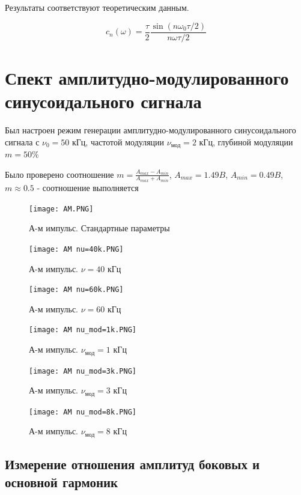 \documentclass[a4paper]{article}
\begin{document}
Результаты соответствуют теоретическим данным.

\begin{equation}
    c_n(\omega) = \frac{\tau}{2} \frac{\sin{(n\omega_0 \tau / 2)}}{n \omega \tau / 2}
\end{equation}

\clearpage
\newpage

\section{Спект амплитудно-модулированного синусоидального сигнала}

Был настроен режим генерации амплитудно-модулированного синусоидального сигнала
с $\nu_0 = 50$ кГц, частотой модуляции $\nu_\text{мод} = 2$ кГц, глубиной модуляции $m = 50\%$

Было проверено соотношение $ m = \frac{A_{max} - A_{min}}{A_{max} + A_{min}} $,
$A_{max} = 1.49B$, $A_{min} = 0.49B$, $m \approx 0.5$ - соотношение выполняется

\begin{figure}[h!]
\centering
\texttt{[image: АМ.PNG]}
\caption{А-м импульс. Стандартные параметры}
\end{figure}

\begin{figure}[h!]
\centering
\texttt{[image: АМ nu=40k.PNG]}
\caption{А-м импульс. $\nu = 40$ кГц}
\end{figure}

\begin{figure}[h!]
\centering
\texttt{[image: АМ nu=60k.PNG]}
\caption{А-м импульс. $\nu = 60$ кГц}
\end{figure}

\begin{figure}[h!]
\centering
\texttt{[image: АМ nu\_mod=1k.PNG]}
\caption{А-м импульс. $\nu_\text{мод} = 1$ кГц}
\end{figure}

\begin{figure}[h!]
\centering
\texttt{[image: АМ nu\_mod=3k.PNG]}
\caption{А-м импульс. $\nu_\text{мод} = 3$ кГц}
\end{figure}

\begin{figure}[h!]
\centering
\texttt{[image: АМ nu\_mod=8k.PNG]}
\caption{А-м импульс. $\nu_\text{мод} = 8$ кГц}
\end{figure}

\clearpage
\newpage

\subsection{Измерение отношения амплитуд боковых и основной гармоник}
\end{document}
